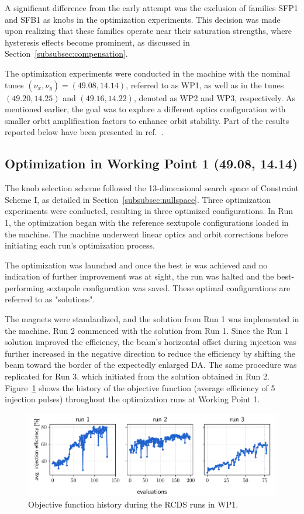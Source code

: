 A significant difference from the early attempt was the exclusion of families SFP1 and SFB1 as knobs in the optimization experiments. This decision was made upon realizing that these families operate near their saturation strengths, where hysteresis effects become prominent, as discussed in Section~\ref{subsubsec:compensation}.

The optimization experiments were conducted in the machine with the nominal tunes $(\nu_x,\nu_y)=(49.08, 14.14)$, referred to as \gls*{WP1}, as well as in the tunes $(49.20, 14.25)$ and $(49.16, 14.22)$, denoted as \gls*{WP2} and \gls*{WP3}, respectively. As mentioned earlier, the goal was to explore a different optics configuration with smaller orbit amplification factors to enhance orbit stability. Part of the results reported below have been presented in ref.~\cite{velloso_online_2023}.

\subsection{Optimization in Working Point 1 (49.08, 14.14)}
The knob selection scheme followed the 13-dimensional search space of Constraint Scheme I, as detailed in Section~\ref{subsubsec:nullspace}. Three optimization experiments were conducted, resulting in three optimized configurations. In Run 1, the optimization began with the reference sextupole configurations loaded in the machine. The machine underwent linear optics and orbit corrections before initiating each run's optimization process.

The optimization was launched and once the best \gls*{ie} was achieved and no indication of further improvement was at sight, the run was halted and the best-performing sextupole configuration was saved. These optimal configurations are referred to as "solutions".

The magnets were standardized, and the solution from Run 1 was implemented in the machine. Run 2 commenced with the solution from Run 1. Since the Run 1 solution improved the efficiency, the beam's horizontal offset during injection was further increased in the negative direction to reduce the efficiency by shifting the beam toward the border of the expectedly enlarged \gls*{DA}. The same procedure was replicated for Run 3, which initiated from the solution obtained in Run 2. Figure~\ref{fig:wp1_history} shows the history of the objective function (average efficiency of 5 injection pulses) throughout the optimization runs at Working Point 1.
\begin{figure}[tb]
    \centering
    \includegraphics[width=\columnwidth]{Images/wp1_objfunc_hist.pdf}
    \caption[Objective function history during the RCDS runs in WP1.]{Objective function history during the \gls*{RCDS} runs in \gls*{WP1}.}
    \label{fig:wp1_history}
\end{figure}
